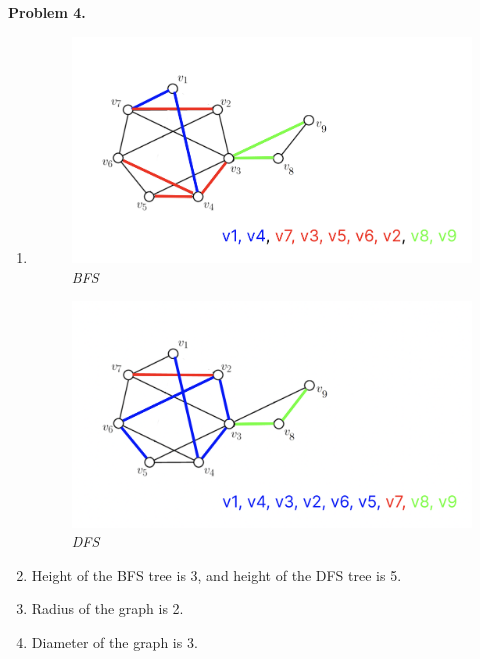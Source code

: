 \documentclass{article}
\begin{document}
\textbf{Problem 4.}
\begin{enumerate}[label=(\alph*)]
    \item 
    \indent
    \begin{figure}[h!]
        \qquad
        \begin{minipage}{.4\textwidth}
            \centering
            {\includegraphics[scale=0.25]{BFS.png}}
            \qquad\qquad\emph{BFS}\label{fig:1}
        \end{minipage}    
        \qquad
        \begin{minipage}{.4\textwidth}
            \centering
            {\includegraphics[scale=0.3]{DFS.png}}
            \qquad\qquad\emph{DFS}\label{fig:2}
        \end{minipage}        
    \end{figure} 

    \item
    Height of the BFS tree is 3, and height of the DFS tree is 5.

    \item
    Radius of the graph is 2.

    \item
    Diameter of the graph is 3.
\end{enumerate}
    
\end{document}
